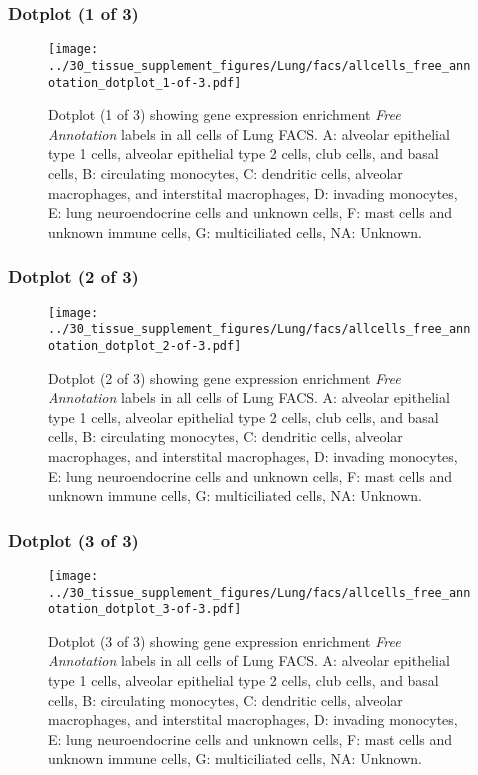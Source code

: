 \clearpage

\subsubsection{Dotplot (1 of 3)}
\begin{figure}[h]
\centering
\texttt{[image: ../30\_tissue\_supplement\_figures/Lung/facs/allcells\_free\_annotation\_dotplot\_1-of-3.pdf]}

\caption{ Dotplot (1 of 3)  showing gene expression enrichment \emph{Free Annotation} labels in all cells of Lung FACS. A: alveolar epithelial type 1 cells, alveolar epithelial type 2 cells, club cells, and basal cells, B: circulating monocytes, C: dendritic cells, alveolar macrophages, and interstital macrophages, D: invading monocytes, E: lung neuroendocrine cells and unknown cells, F: mast cells and unknown immune cells, G: multiciliated cells, NA: Unknown.}
\end{figure}


\clearpage

\subsubsection{Dotplot (2 of 3)}
\begin{figure}[h]
\centering
\texttt{[image: ../30\_tissue\_supplement\_figures/Lung/facs/allcells\_free\_annotation\_dotplot\_2-of-3.pdf]}

\caption{ Dotplot (2 of 3)  showing gene expression enrichment \emph{Free Annotation} labels in all cells of Lung FACS. A: alveolar epithelial type 1 cells, alveolar epithelial type 2 cells, club cells, and basal cells, B: circulating monocytes, C: dendritic cells, alveolar macrophages, and interstital macrophages, D: invading monocytes, E: lung neuroendocrine cells and unknown cells, F: mast cells and unknown immune cells, G: multiciliated cells, NA: Unknown.}
\end{figure}


\clearpage

\subsubsection{Dotplot (3 of 3)}
\begin{figure}[h]
\centering
\texttt{[image: ../30\_tissue\_supplement\_figures/Lung/facs/allcells\_free\_annotation\_dotplot\_3-of-3.pdf]}

\caption{ Dotplot (3 of 3)  showing gene expression enrichment \emph{Free Annotation} labels in all cells of Lung FACS. A: alveolar epithelial type 1 cells, alveolar epithelial type 2 cells, club cells, and basal cells, B: circulating monocytes, C: dendritic cells, alveolar macrophages, and interstital macrophages, D: invading monocytes, E: lung neuroendocrine cells and unknown cells, F: mast cells and unknown immune cells, G: multiciliated cells, NA: Unknown.}
\end{figure}

